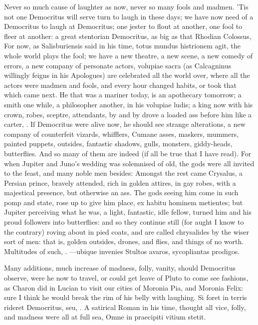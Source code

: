 {Never so much cause of laughter as now, never so many fools and madmen.
'Tis not one Democritus will serve turn to laugh in these days; we
have now need of a Democritus to laugh at Democritus; one jester to
flout at another, one fool to fleer at another: a great stentorian
Democritus, as big as that Rhodian Colossus, For now, as
Salisburiensis said in his time, totus mundus histrionem agit, the
whole world plays the fool; we have a new theatre, a new scene, a new
comedy of errors, a new company of personate actors, volupiae sacra (as
Calcagninus willingly feigns in his Apologues) are celebrated all the
world over, where all the actors were madmen and fools, and every
hour changed habits, or took that which came next. He that was a
mariner today, is an apothecary tomorrow; a smith one while, a
philosopher another, in his volupiae ludis; a king now with his crown,
robes, sceptre, attendants, by and by drove a loaded ass before him
like a carter, \etc{}. If Democritus were alive now, he should see strange
alterations, a new company of counterfeit vizards, whifflers, Cumane
asses, maskers, mummers, painted puppets, outsides, fantastic shadows,
gulls, monsters, giddy-heads, butterflies. And so many of them are
indeed (if all be true that I have read). For when Jupiter and
Juno's wedding was solemnised of old, the gods were all invited to the
feast, and many noble men besides: Amongst the rest came Crysalus, a
Persian prince, bravely attended, rich in golden attires, in gay robes,
with a majestical presence, but otherwise an ass. The gods seeing him
come in such pomp and state, rose up to give him place, ex habitu
hominem metientes; but Jupiter perceiving what he was, a light,
fantastic, idle fellow, turned him and his proud followers into
butterflies: and so they continue still (for aught I know to the
contrary) roving about in pied coats, and are called chrysalides by the
wiser sort of men: that is, golden outsides, drones, and flies, and
things of no worth. Multitudes of such, \etc{}.
---ubique invenies
Stultos avaros, sycopliantas prodigos.

Many additions, much increase of madness, folly, vanity, should
Democritus observe, were he now to travel, or could get leave of Pluto
to come see fashions, as Charon did in Lucian to visit our cities of
Moronia Pia, and Moronia Felix: sure I think he would break the rim of
his belly with laughing. Si foret in terris rideret Democritus,
seu, \etc{}. A satirical Roman in his time, thought all vice, folly, and
madness were all at full sea, Omne in praecipiti vitium stetit.

}
